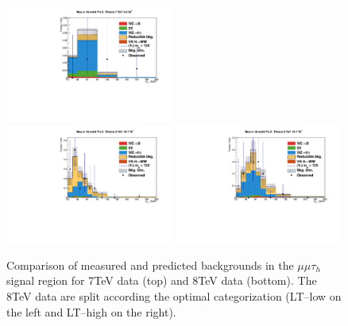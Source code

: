 \begin{figure}
\begin{center}
  \includegraphics[width=0.49\textwidth]{4_Analisys/pics/7TeV/plots/mmt/LTCut/final-subMass-LTCut.pdf}\\
  \includegraphics[width=0.49\textwidth]{4_Analisys/pics/8TeV/plots/mmt/LTLow/final-subMass-LTLow.pdf}
  \includegraphics[width=0.49\textwidth]{4_Analisys/pics/8TeV/plots/mmt/LTHigh/final-subMass-LTHigh.pdf}\\
  \caption{Comparison of measured and predicted backgrounds in the $\mu\mu\tau_h$ signal region for 7TeV data (top) and 8TeV data (bottom). The 8TeV data are split according the optimal categorization (LT--low on the left and LT--high on the right).}
  \label{fig:LLT_mmt_prefit}
\end{center}
\end{figure}

